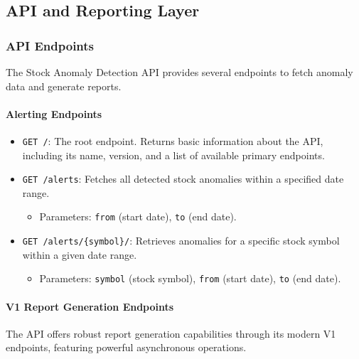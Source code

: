 \break





\subsection{API and Reporting Layer}

\subsubsection{API Endpoints}
The Stock Anomaly Detection API provides several endpoints to fetch anomaly data and generate reports.

\paragraph{Alerting Endpoints}
\begin{itemize}
    \item \verb|GET /|: The root endpoint. Returns basic information about the API, including its name, version, and a list of available primary endpoints.
    \item \verb|GET /alerts|: Fetches all detected stock anomalies within a specified date range.
    \begin{itemize}
        \item Parameters: \verb|from| (start date), \verb|to| (end date).
    \end{itemize}
    \item \verb|GET /alerts/{symbol}/|: Retrieves anomalies for a specific stock symbol within a given date range.
    \begin{itemize}
        \item Parameters: \verb|symbol| (stock symbol), \verb|from| (start date), \verb|to| (end date).
    \end{itemize}
\end{itemize}

\paragraph{V1 Report Generation Endpoints}
The API offers robust report generation capabilities through its modern V1 endpoints, featuring powerful asynchronous operations.

